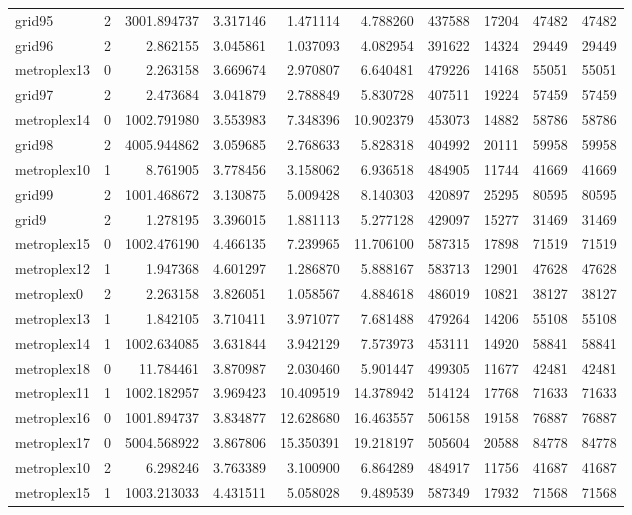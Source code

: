 \begin{longtable}{|l|r|r|r|r|r|r|r|r|r|}
grid95 & 2 & 3001.894737 & 3.317146 & 1.471114 & 4.788260 & 437588 & 17204 & 47482 & 47482 \\
grid96 & 2 & 2.862155 & 3.045861 & 1.037093 & 4.082954 & 391622 & 14324 & 29449 & 29449 \\
metroplex13 & 0 & 2.263158 & 3.669674 & 2.970807 & 6.640481 & 479226 & 14168 & 55051 & 55051 \\
grid97 & 2 & 2.473684 & 3.041879 & 2.788849 & 5.830728 & 407511 & 19224 & 57459 & 57459 \\
metroplex14 & 0 & 1002.791980 & 3.553983 & 7.348396 & 10.902379 & 453073 & 14882 & 58786 & 58786 \\
grid98 & 2 & 4005.944862 & 3.059685 & 2.768633 & 5.828318 & 404992 & 20111 & 59958 & 59958 \\
metroplex10 & 1 & 8.761905 & 3.778456 & 3.158062 & 6.936518 & 484905 & 11744 & 41669 & 41669 \\
grid99 & 2 & 1001.468672 & 3.130875 & 5.009428 & 8.140303 & 420897 & 25295 & 80595 & 80595 \\
grid9 & 2 & 1.278195 & 3.396015 & 1.881113 & 5.277128 & 429097 & 15277 & 31469 & 31469 \\
metroplex15 & 0 & 1002.476190 & 4.466135 & 7.239965 & 11.706100 & 587315 & 17898 & 71519 & 71519 \\
metroplex12 & 1 & 1.947368 & 4.601297 & 1.286870 & 5.888167 & 583713 & 12901 & 47628 & 47628 \\
metroplex0 & 2 & 2.263158 & 3.826051 & 1.058567 & 4.884618 & 486019 & 10821 & 38127 & 38127 \\
metroplex13 & 1 & 1.842105 & 3.710411 & 3.971077 & 7.681488 & 479264 & 14206 & 55108 & 55108 \\
metroplex14 & 1 & 1002.634085 & 3.631844 & 3.942129 & 7.573973 & 453111 & 14920 & 58841 & 58841 \\
metroplex18 & 0 & 11.784461 & 3.870987 & 2.030460 & 5.901447 & 499305 & 11677 & 42481 & 42481 \\
metroplex11 & 1 & 1002.182957 & 3.969423 & 10.409519 & 14.378942 & 514124 & 17768 & 71633 & 71633 \\
metroplex16 & 0 & 1001.894737 & 3.834877 & 12.628680 & 16.463557 & 506158 & 19158 & 76887 & 76887 \\
metroplex17 & 0 & 5004.568922 & 3.867806 & 15.350391 & 19.218197 & 505604 & 20588 & 84778 & 84778 \\
metroplex10 & 2 & 6.298246 & 3.763389 & 3.100900 & 6.864289 & 484917 & 11756 & 41687 & 41687 \\
metroplex15 & 1 & 1003.213033 & 4.431511 & 5.058028 & 9.489539 & 587349 & 17932 & 71568 & 71568 \\

\end{longtable}
